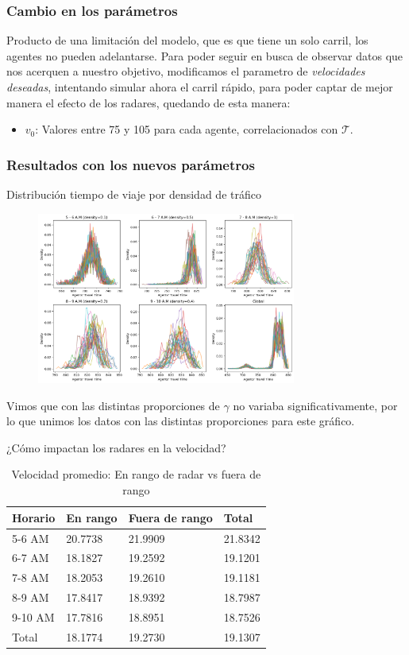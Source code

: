 \documentclass[10pt, compress]{beamer}
\begin{document}
\begin{frame}
\frametitle{Cambio en los par\'ametros}

Producto de una limitaci\'on del modelo, que es que tiene un solo carril, los agentes no pueden adelantarse. Para poder seguir en busca de observar datos que nos acerquen a nuestro objetivo, modificamos el parametro de \textit{velocidades deseadas}, intentando simular ahora el carril r\'apido, para poder captar de mejor manera el efecto de los radares, quedando de esta manera:

\begin{itemize}
\item $v_0$: Valores entre 75 y 105 para cada agente, correlacionados con $\mathcal{T}$.
\end{itemize}

\end{frame}

\begin{frame}
\frametitle{Resultados con los nuevos par\'ametros}

\centering
Distribuci\'on tiempo de viaje por densidad de tr\'afico

\begin{figure}
\centering
\includegraphics[width=23em]{images/travel_time_global.png}
\end{figure}
\footnotesize{Vimos que con las distintas proporciones de $\gamma$ no variaba significativamente, por lo que unimos los datos con las distintas proporciones para este gráfico.}

\end{frame}

\begin{frame}{¿C\'omo impactan los radares en la velocidad?}
  \begin{table}
    \caption{Velocidad promedio: En rango de radar vs fuera de rango}
    \begin{tabular}{llll}
      \toprule
      Horario & En rango & Fuera de rango & Total \\
      \midrule
      5-6 AM & 20.7738 & 21.9909 & 21.8342\\
      6-7 AM & 18.1827 & 19.2592 & 19.1201\\
      7-8 AM & 18.2053 & 19.2610 & 19.1181\\
      8-9 AM & 17.8417 & 18.9392 & 18.7987\\
      9-10 AM & 17.7816 & 18.8951 & 18.7526\\
      Total & 18.1774 & 19.2730 & 19.1307\\
      \bottomrule
    \end{tabular}
  \end{table}
\end{frame}
\end{document}
